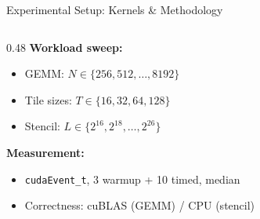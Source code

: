 \documentclass[aspectratio=169,10pt]{beamer}
\begin{document}
\begin{frame}{Experimental Setup: Kernels \& Methodology}
\begin{columns}[T]
\begin{column}{0.48\textwidth}
\vspace{0.5em}
\textbf{Workload sweep:}
\begin{itemize}\scriptsize
    \item GEMM: $N \in \{256, 512, \ldots, 8192\}$
    \item Tile sizes: $T \in \{16, 32, 64, 128\}$
    \item Stencil: $L \in \{2^{16}, 2^{18}, \ldots, 2^{26}\}$
\end{itemize}

\vspace{0.5em}
\textbf{Measurement:}
\begin{itemize}\scriptsize
    \item \texttt{cudaEvent\_t}, 3 warmup + 10 timed, median
    \item Correctness: cuBLAS (GEMM) / CPU (stencil)
\end{itemize}
\end{column}
\end{columns}
\end{frame}
\end{document}
